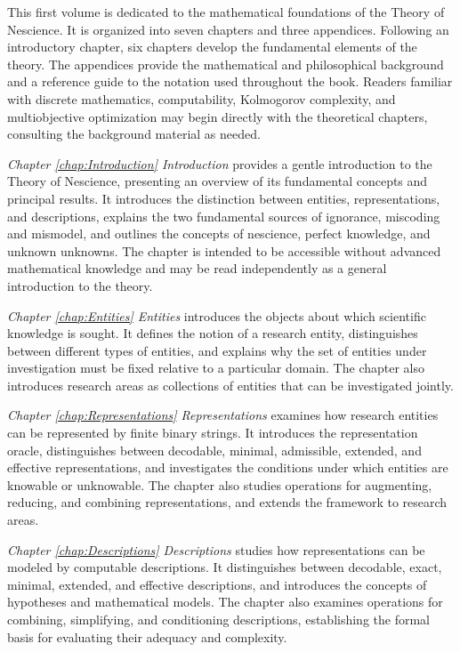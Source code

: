 This first volume is dedicated to the mathematical foundations of the Theory of Nescience. It is organized into seven chapters and three appendices. Following an introductory chapter, six chapters develop the fundamental elements of the theory. The appendices provide the mathematical and philosophical background and a reference guide to the notation used throughout the book. Readers familiar with discrete mathematics, computability, Kolmogorov complexity, and multiobjective optimization may begin directly with the theoretical chapters, consulting the background material as needed.

\emph{Chapter \ref{chap:Introduction} Introduction} provides a gentle introduction to the Theory of Nescience, presenting an overview of its fundamental concepts and principal results. It introduces the distinction between entities, representations, and descriptions, explains the two fundamental sources of ignorance, miscoding and mismodel, and outlines the concepts of nescience, perfect knowledge, and unknown unknowns. The chapter is intended to be accessible without advanced mathematical knowledge and may be read independently as a general introduction to the theory.

\emph{Chapter \ref{chap:Entities} Entities} introduces the objects about which scientific knowledge is sought. It defines the notion of a research entity, distinguishes between different types of entities, and explains why the set of entities under investigation must be fixed relative to a particular domain. The chapter also introduces research areas as collections of entities that can be investigated jointly.

\emph{Chapter \ref{chap:Representations} Representations} examines how research entities can be represented by finite binary strings. It introduces the representation oracle, distinguishes between decodable, minimal, admissible, extended, and effective representations, and investigates the conditions under which entities are knowable or unknowable. The chapter also studies operations for augmenting, reducing, and combining representations, and extends the framework to research areas.

\emph{Chapter \ref{chap:Descriptions} Descriptions} studies how representations can be modeled by computable descriptions. It distinguishes between decodable, exact, minimal, extended, and effective descriptions, and introduces the concepts of hypotheses and mathematical models. The chapter also examines operations for combining, simplifying, and conditioning descriptions, establishing the formal basis for evaluating their adequacy and complexity.

